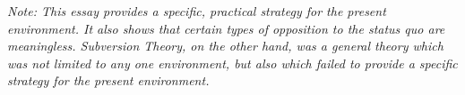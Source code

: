 \vfill 
{ \itshape
Note: This essay provides a specific, practical strategy for the present 
environment. It also shows that certain types of opposition to the status quo 
are meaningless. Subversion Theory, on the other hand, was a general theory 
which was not limited to any one environment, but also which failed to 
provide a specific strategy for the present environment. \par }


